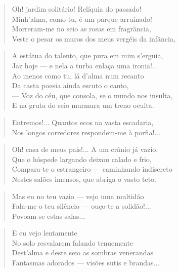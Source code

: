 \begin{anexosenv}
\begin{verse}
Oh! jardim solitário! Relíquia do passado! \\
Minh'alma, como tu, é um parque arruinado! \\
Morreram-me no seio as rosas em fragrância, \\
Veste o pesar os muros dos meus vergéis da infância, \\
\end{verse}

\begin{verse}
A estátua do talento, que pura em mim s'erguia, \\
Jaz hoje — e nela a turba enlaça uma ironia!... \\
Ao menos como tu, lá d'alma num recanto \\
Da casta poesia ainda escuto o canto, \\
— Voz do céu, que consola, se o mundo nos insulta, \\
E na gruta do seio murmura um treno oculta. \\
\end{verse}

\begin{verse}
Entremos!... Quantos ecos na vasta escadaria, \\
Nos longos corredores respondem-me à porfia!... \\
\end{verse}

\begin{verse}
Oh! casa de meus pais!... A um crânio já vazio, \\
Que o hóspede largando deixou calado e frio, \\
Compara-te o estrangeiro — caminhando indiscreto \\
Nestes salões imensos, que abriga o vasto teto. \\
\end{verse}

\begin{verse}
Mas eu no teu vazio — vejo uma multidão \\
Fala-me o teu silêncio — ouço-te a solidão!... \\
Povoam-se estas salas... \\
\end{verse}

\begin{verse}
E eu vejo lentamente \\
No solo resvalarem falando tenuemente \\
Dest'alma e deste seio as sombras venerandas \\
Fantasmas adorados — visões sutis e brandas... \\
\end{verse}


\end{anexosenv}
